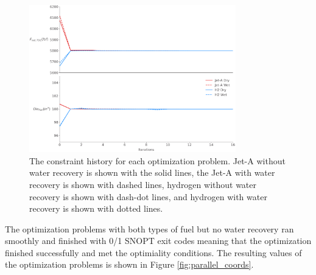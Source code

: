 \documentclass[conf]{new-aiaa}
\begin{document}
\begin{figure}[hbt!]
    \centering
    \includegraphics[width=0.8\textwidth]{cons.pdf}
    \caption{The constraint history for each optimization problem.
        Jet-A without water recovery is shown with the solid lines, the Jet-A with water recovery is shown with dashed lines, hydrogen without water recovery is shown with dash-dot lines, and hydrogen with water recovery is shown with dotted lines.}
    \label{fig:history_cons}
\end{figure}

The optimization problems with both types of fuel but no water recovery ran smoothly and finished with 0/1 SNOPT exit codes meaning that the optimization finished successfully and met the optimiality conditions.
The resulting values of the optimization problems is shown in Figure \ref{fig:parallel_coords}.
\end{document}
